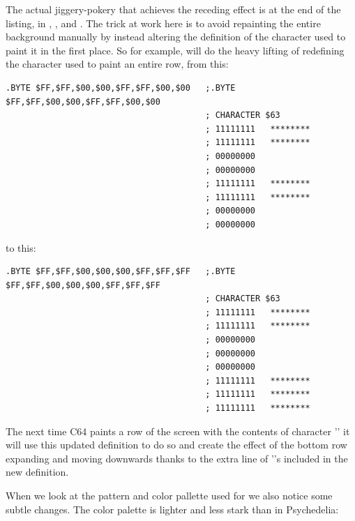 The actual jiggery-pokery that achieves the receding effect is at the end of the listing, in , ,
and . The trick at work here is to avoid repainting the entire background manually by instead altering the definition of the character
used to paint it in the first place. So for example,  will do the heavy lifting of redefining the character used to paint an entire row,
from this:
\begin{lstlisting}[basicstyle=\ttfamily\tiny,escapechar=\%]
.BYTE $FF,$FF,$00,$00,$FF,$FF,$00,$00   ;.BYTE $FF,$FF,$00,$00,$FF,$FF,$00,$00
                                        ; CHARACTER $63
                                        ; 11111111   ********
                                        ; 11111111   ********
                                        ; 00000000           
                                        ; 00000000           
                                        ; 11111111   ********
                                        ; 11111111   ********
                                        ; 00000000           
                                        ; 00000000           
\end{lstlisting}
to this:
\begin{lstlisting}[basicstyle=\ttfamily\tiny,escapechar=\%]
.BYTE $FF,$FF,$00,$00,$00,$FF,$FF,$FF   ;.BYTE $FF,$FF,$00,$00,$00,$FF,$FF,$FF
                                        ; CHARACTER $63
                                        ; 11111111   ********
                                        ; 11111111   ********
                                        ; 00000000           
                                        ; 00000000           
                                        ; 00000000           
                                        ; 11111111   ********
                                        ; 11111111   ********
                                        ; 11111111   ********
\end{lstlisting}

The next time C64 paints a row of the screen with the contents of character '' it will use this updated definition to do so and create the 
effect of the bottom row expanding and moving downwards thanks to the extra line of ''s included in the new definition.

When we look at the pattern and color pallette used for we also notice some subtle changes. The color palette is lighter and less stark than in
Psychedelia:

